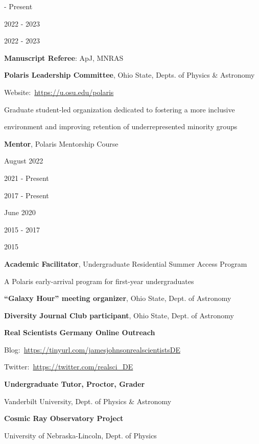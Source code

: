 \documentclass[cv.tex]{subfiles}
\begin{document}
\parbox{0.18\textwidth}{%
	 - Present \par
	2022 - 2023 \par
	\null \par
	\null \par
	\null \par
	2022 - 2023 \par
}
\hspace{1mm}
\parbox{0.8\textwidth}{%
	\vspace{1mm}
	\textbf{Manuscript Referee}: ApJ, MNRAS \par
	\textbf{Polaris Leadership Committee}, Ohio State, Depts. of Physics \&
	Astronomy \par
	Website:~\url{https://u.osu.edu/polaris} \par
	Graduate student-led organization dedicated to fostering a more inclusive
	\par
	environment and improving retention of underrepresented minority groups \par
	\textbf{Mentor}, Polaris Mentorship Course \par
}

\noindent
\parbox{0.18\textwidth}{%
	\raggedleft
	August 2022 \par
	\null \par
	2021 - Present \par
	2017 - Present \par
	June 2020 \par
	\null \par
	\null \par
	2015 - 2017 \par
	\null \par
	2015 \par
	\null \par
}
\hspace{1mm}
\parbox{0.8\textwidth}{%
	\vspace{1mm}
	\textbf{Academic Facilitator}, Undergraduate Residential Summer Access
	Program \par
	A Polaris early-arrival program for first-year undergraduates \par
	\textbf{``Galaxy Hour'' meeting organizer}, Ohio State, Dept. of Astronomy
	\par
	\textbf{Diversity Journal Club participant}, Ohio State,
	Dept. of Astronomy \par
	\textbf{Real Scientists Germany Online Outreach} \par
	Blog:~\url{https://tinyurl.com/jamesjohnsonrealscientistsDE} \par
	Twitter:~\url{https://twitter.com/realsci_DE} \par
	\textbf{Undergraduate Tutor, Proctor, Grader} \par
	Vanderbilt University, Dept. of Physics \& Astronomy \par
	\textbf{Cosmic Ray Observatory Project} \par
	University of Nebraska-Lincoln, Dept. of Physics \par
}
\end{document}
